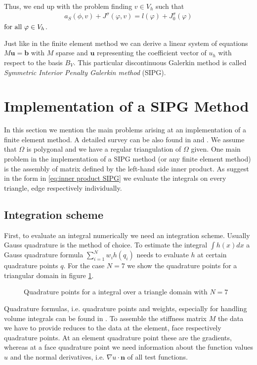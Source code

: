 \begin{definition} 
Thus, we end up with the problem finding $v \in V_h$ such that
\begin{align}
	a_S(\phi,v) + J^\sigma(\varphi,v) = l(\varphi) + J^\sigma_0(\varphi) \label{eq: DG system}
\end{align}
$  \textnormal{for all } \varphi \in V_h$. 

Just like in the finite element method we can derive a linear system of equations $M \mathbf{u} = \mathbf{b}$ with $M$ sparse and $\mathbf{u}$ representing the coefficient vector of $u_h$ with respect to the basis $B_V$.
This particular discontinuous Galerkin method is called \emph{Symmetric Interior Penalty Galerkin method} (SIPG).



\section{Implementation of a SIPG Method}

In this section we mention the main problems arising at an implementation of a finite element method. A detailed survey can be also found in \cite[Section 0.6]{BS2002} and \cite[Chapter 8]{Braess2003}.
We assume that $\Omega$ is polygonal and we have a regular triangulation of $\Omega$ given. One main problem in the implementation of a SIPG method (or any finite element method) is the assembly of matrix defined by the left-hand side inner product. As suggest in the form in \eqref{eq:inner product SIPG} we evaluate the integrals on every triangle, edge respectively individually.

\subsection{Integration scheme}
First, to evaluate an integral numerically we need an integration scheme. Usually Gauss quadrature is the method of choice. To estimate the integral $\int h(x) dx$ a Gauss quadrature formula $\sum_{i=1}^{N} w_i h(q_i)$ needs to evaluate $h$ at certain quadrature points $q$. For the case $N=7$ we show the quadrature points for a triangular domain in figure \ref{fig: quadrature}.
\begin{figure}[!h]
	\centering
	
	\caption{Quadrature points for a integral over a triangle domain with $N=7$}
	 \label{fig: quadrature}
\end{figure}
Quadrature formulas, i.e. quadrature points and weights, especially for handling volume integrals can be found in \cite{Strout1971}.
To assemble the stiffness matrix $M$ the data we have to provide reduces to the data at the element, face respectively quadrature points.  
At an element quadrature point these are the gradients, whereas at a face quadrature point we need information about  the function values $u$ and the normal derivatives, i.e. $\nabla u \cdot \mathbf{n}$ of all test functions.


\end{definition}

